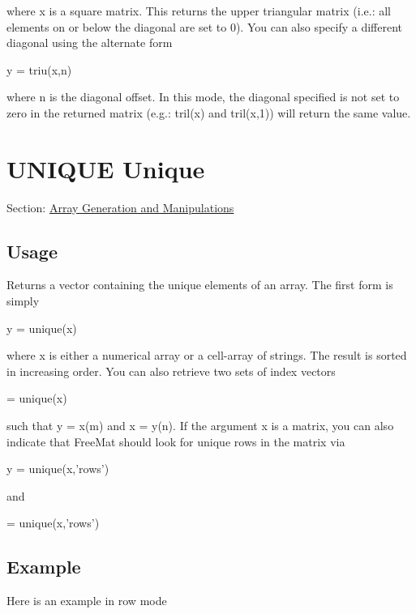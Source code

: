  where x is a square matrix. This returns the upper triangular matrix (i.\-e.\-: all elements on or below the diagonal are set to 0). You can also specify a different diagonal using the alternate form \begin{DoxyVerb}   y = triu(x,n)
\end{DoxyVerb}
 where n is the diagonal offset. In this mode, the diagonal specified is not set to zero in the returned matrix (e.\-g.\-: tril(x) and tril(x,1)) will return the same value. \hypertarget{array_unique}{}\section{U\-N\-I\-Q\-U\-E Unique}\label{array_unique}
Section\-: \hyperlink{sec_array}{Array Generation and Manipulations} \hypertarget{vtkwidgets_vtkxyplotwidget_Usage}{}\subsection{Usage}\label{vtkwidgets_vtkxyplotwidget_Usage}
Returns a vector containing the unique elements of an array. The first form is simply \begin{DoxyVerb}   y = unique(x)
\end{DoxyVerb}
 where {\ttfamily x} is either a numerical array or a cell-\/array of strings. The result is sorted in increasing order. You can also retrieve two sets of index vectors \begin{DoxyVerb}   [y, m, n] = unique(x)
\end{DoxyVerb}
 such that {\ttfamily y = x(m)} and {\ttfamily x = y(n)}. If the argument {\ttfamily x} is a matrix, you can also indicate that Free\-Mat should look for unique rows in the matrix via \begin{DoxyVerb}   y = unique(x,'rows')
\end{DoxyVerb}
 and \begin{DoxyVerb}   [y, m, n] = unique(x,'rows')
\end{DoxyVerb}
 \hypertarget{variables_struct_Example}{}\subsection{Example}\label{variables_struct_Example}
Here is an example in row mode


